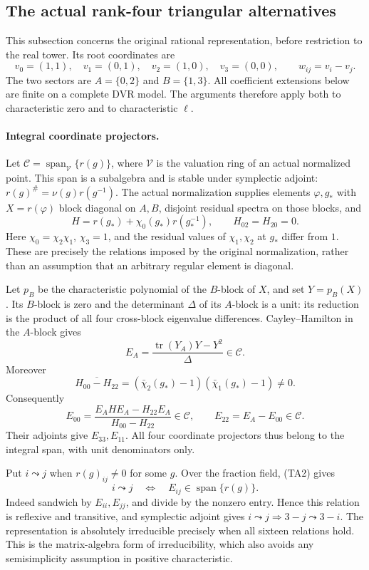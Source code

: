 \subsection{The actual rank-four triangular alternatives}
\label{subsec:sr-four-actual-triangular-alternatives}

This subsection concerns the original rational representation,
before restriction to the real tower. Its root coordinates are
\[
 v_0=(1,1),\quad v_1=(0,1),\quad v_2=(1,0),\quad v_3=(0,0),
 \qquad w_{ij}=v_i-v_j.
\]
The two sectors are \(A=\{0,2\}\) and \(B=\{1,3\}\).
All coefficient extensions below are finite on a complete DVR
model. The arguments therefore apply both to characteristic zero
and to characteristic \(\ell\).

\paragraph{Integral coordinate projectors.}
Let \(\mathcal C=\operatorname{span}_{\mathcal V}\{r(g)\}\),
where \(\mathcal V\) is the valuation ring of an actual
normalized point. This span is a subalgebra and is stable under
symplectic adjoint: \(r(g)^\#=\nu(g)r(g^{-1})\).
The actual normalization supplies elements \(\varphi,g_*\) with
\(X=r(\varphi)\) block diagonal on \(A,B\), disjoint residual
spectra on those blocks, and
\[
 H=r(g_*)+\chi_0(g_*)r(g_*^{-1}),\qquad H_{02}=H_{20}=0.
 \tag{TA1}
\]
Here \(\chi_0=\chi_2\chi_1\), \(\chi_3=1\), and the residual
values of \(\chi_1,\chi_2\) at \(g_*\) differ from \(1\).
These are precisely the relations imposed by the original
normalization, rather than an assumption that an arbitrary
regular element is diagonal.

Let \(p_B\) be the characteristic polynomial of the \(B\)-block
of \(X\), and set \(Y=p_B(X)\).
Its \(B\)-block is zero and the determinant \(\Delta\) of its
\(A\)-block is a unit: its reduction is the product of all four
cross-block eigenvalue differences.
Cayley--Hamilton in the \(A\)-block gives
\[
 E_A=\frac{\operatorname{tr}(Y_A)Y-Y^2}{\Delta}
                                                       \in\mathcal C.
\]
Moreover
\[
 \overline{H_{00}-H_{22}}
       =(\bar\chi_2(g_*)-1)(\bar\chi_1(g_*)-1)\ne0.
\]
Consequently
\[
 E_{00}=\frac{E_AHE_A-H_{22}E_A}{H_{00}-H_{22}}\in\mathcal C,
 \qquad E_{22}=E_A-E_{00}\in\mathcal C .
 \tag{TA2}
\]
Their adjoints give \(E_{33},E_{11}\).
All four coordinate projectors thus belong to the integral
span, with unit denominators only.

Put \(i\leadsto j\) when \(r(g)_{ij}\ne0\) for some \(g\).
Over the fraction field, (TA2) gives
\[
 i\leadsto j\quad\Longleftrightarrow\quad
       E_{ij}\in\operatorname{span}\{r(g)\}.
 \tag{TA3}
\]
Indeed sandwich by \(E_{ii},E_{jj}\), and divide by the nonzero
entry. Hence this relation is reflexive and transitive,
and symplectic adjoint gives
\(i\leadsto j\Rightarrow 3-j\leadsto3-i\).
The representation is absolutely irreducible precisely when
all sixteen relations hold. This is the matrix-algebra form
of irreducibility, which also avoids any semisimplicity
assumption in positive characteristic.

